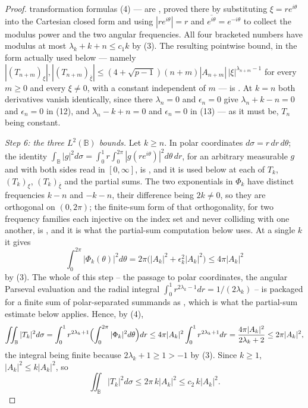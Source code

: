 \begin{proof}
transformation formulas (4) --- are ,
proved there by substituting $\xi=re^{i\theta}$ into the Cartesian closed form
and using $|re^{i\theta}|=r$ and $\overline{e^{i\theta}}=e^{-i\theta}$ to collect
the modulus power and the two angular frequencies.
All four bracketed numbers have modulus at most $\lambda_k+k+n\le c_1k$ by (3).
The resulting pointwise bound, in the form actually used below --- namely
$|(T_{n+m})_\xi|,|(T_{n+m})_{\bar\xi}|
\le(4+\sqrt{p-1})(n+m)|A_{n+m}|\,|\xi|^{\lambda_{n+m}-1}$ for every $m\ge0$
and every $\xi\neq0$, with a constant independent of $m$ --- is
.
At $k=n$ both derivatives vanish identically, since there $\lambda_n=0$ and
$\epsilon_n=0$ give $\lambda_n+k-n=0$ and $\epsilon_n=0$ in (12), and
$\lambda_n-k+n=0$ and $\epsilon_n=0$ in (13) --- as it must be, $T_n$ being
constant.

\emph{Step 6: the three $L^2(\mathbb{B})$ bounds.}  Let $k\ge n$.  In polar
coordinates $d\sigma=r\,dr\,d\theta$; the identity
$\int_{\mathbb{B}}|g|^{2}d\sigma=\int_0^1r\int_0^{2\pi}|g(re^{i\theta})|^{2}
d\theta\,dr$, for an arbitrary measurable $g$ and with both sides read in
$[0,\infty]$, is , and it is used below at each
of $T_k$, $(T_k)_\xi$, $(T_k)_{\bar\xi}$ and the partial sums.  The two exponentials in $\Phi_k$ have
distinct frequencies $k-n$ and $-k-n$, their difference being $2k\neq0$, so
they are orthogonal on $(0,2\pi)$; the finite-sum form of that orthogonality,
for two frequency families each injective on the index set and never colliding
with one another, is , and it is what the
partial-sum computation below uses.  At a single $k$ it gives
\[
  \int_0^{2\pi}|\Phi_k(\theta)|^2d\theta
  =2\pi\bigl(|A_k|^2+\epsilon_k^2|A_k|^2\bigr)\le4\pi|A_k|^2
\]
by (3).  The whole of this step -- the passage to polar coordinates, the
angular Parseval evaluation and the radial integral
$\int_0^1r^{2\lambda_k-1}dr=1/(2\lambda_k)$ -- is packaged for a finite sum of
polar-separated summands as , which is what
the partial-sum estimate below applies.  Hence, by (4),
\[
  \iint_{\mathbb{B}}|T_k|^2d\sigma
  =\int_0^1r^{2\lambda_k+1}\Bigl(\int_0^{2\pi}|\Phi_k|^2d\theta\Bigr)dr
  \le4\pi|A_k|^2\int_0^1r^{2\lambda_k+1}dr
  =\frac{4\pi|A_k|^2}{2\lambda_k+2}\le2\pi|A_k|^2,
\]
the integral being finite because $2\lambda_k+1\ge1>-1$ by (3).  Since
$k\ge1$, $|A_k|^2\le k|A_k|^2$, so
\begin{equation}\tag{14}
  \iint_{\mathbb{B}}|T_k|^2d\sigma\le2\pi\,k|A_k|^2\le c_2\,k|A_k|^2 .
\end{equation}


\end{proof}
